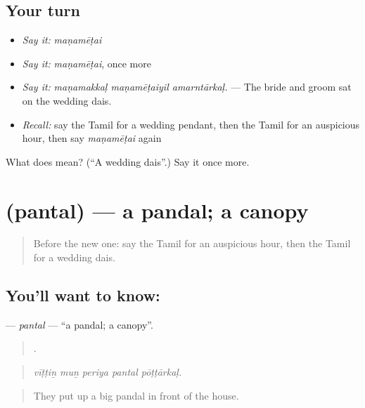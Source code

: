 \subsection*{Your turn}
\begin{itemize}
\raggedright
  \item \emph{Say it:} \emph{maṇamēṭai}
  \item \emph{Say it:} \emph{maṇamēṭai}, once more
  \item \emph{Say it:} \emph{maṇamakkaḷ maṇamēṭaiyil amarntārkaḷ.} — The bride and groom sat on the wedding dais.
  \item \emph{Recall:} say the Tamil for a wedding pendant, then the Tamil for an auspicious hour, then say \emph{maṇamēṭai} again
\end{itemize}

\begin{tcolorbox}[breakable,colback=teal!4,colframe=teal!35!black,title={Before you move on}]
What does  mean? (\textquotedblleft{}A wedding dais\textquotedblright{}.) Say it once more.
\end{tcolorbox}
\section[\texorpdfstring{\ta{பந்தல்} (pantal)}{பந்தல் (pantal)}]{ (pantal) — a pandal; a canopy}

\label{lesson:TA-C322-pantal}



\begin{quote}
Before the new one: say the Tamil for an auspicious hour, then the Tamil for a wedding dais.
\end{quote}

\subsection*{You'll want to know: }
\textbf{} — \emph{pantal} — \textquotedblleft{}a pandal; a canopy\textquotedblright{}.

\begin{quote}
    .
\end{quote}

\begin{quote}
\emph{vīṭṭiṉ muṉ periya pantal pōṭṭārkaḷ.}
\end{quote}

\begin{quote}
They put up a big pandal in front of the house.
\end{quote}

